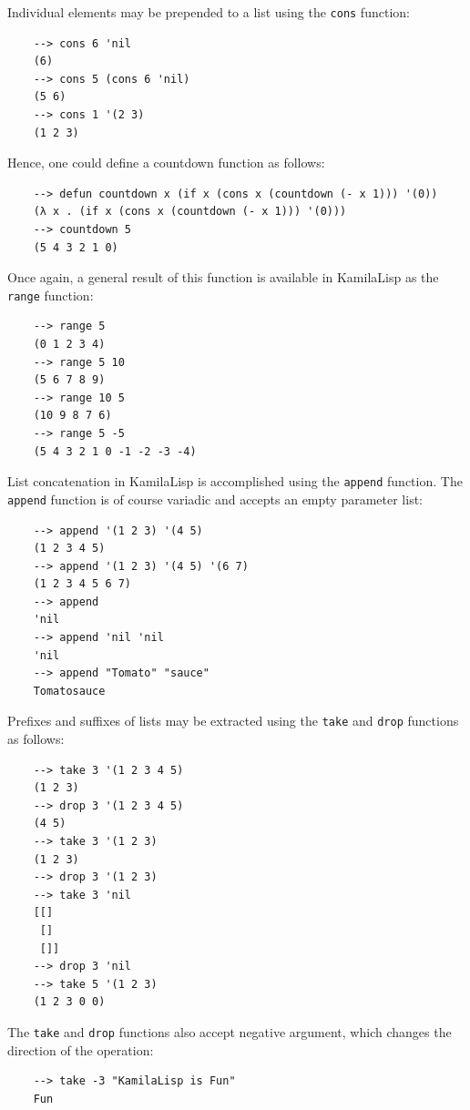 Individual elements may be prepended to a list using the \verb|cons| function:

\begin{Verbatim}
    --> cons 6 'nil
    (6)
    --> cons 5 (cons 6 'nil)
    (5 6)
    --> cons 1 '(2 3)
    (1 2 3)
\end{Verbatim}

Hence, one could define a countdown function as follows:

\begin{Verbatim}
    --> defun countdown x (if x (cons x (countdown (- x 1))) '(0))
    (λ x . (if x (cons x (countdown (- x 1))) '(0)))
    --> countdown 5
    (5 4 3 2 1 0)
\end{Verbatim}

Once again, a general result of this function is available in KamilaLisp as the \verb|range| function:

\begin{Verbatim}
    --> range 5
    (0 1 2 3 4)
    --> range 5 10
    (5 6 7 8 9)
    --> range 10 5
    (10 9 8 7 6)
    --> range 5 -5
    (5 4 3 2 1 0 -1 -2 -3 -4)
\end{Verbatim}

List concatenation in KamilaLisp is accomplished using the \verb|append| function. The \verb|append| function is of course variadic and accepts an empty parameter list:

\begin{Verbatim}
    --> append '(1 2 3) '(4 5)
    (1 2 3 4 5)
    --> append '(1 2 3) '(4 5) '(6 7)
    (1 2 3 4 5 6 7)
    --> append
    'nil
    --> append 'nil 'nil
    'nil
    --> append "Tomato" "sauce"
    Tomatosauce
\end{Verbatim}

Prefixes and suffixes of lists may be extracted using the \verb|take| and \verb|drop| functions as follows:

\begin{Verbatim}
    --> take 3 '(1 2 3 4 5)
    (1 2 3)
    --> drop 3 '(1 2 3 4 5)
    (4 5)
    --> take 3 '(1 2 3)
    (1 2 3)
    --> drop 3 '(1 2 3)
    --> take 3 'nil
    [[]
     []
     []]
    --> drop 3 'nil
    --> take 5 '(1 2 3)
    (1 2 3 0 0)
\end{Verbatim}

The \verb|take| and \verb|drop| functions also accept negative argument, which changes the direction of the operation:

\begin{Verbatim}
    --> take -3 "KamilaLisp is Fun"
    Fun
\end{Verbatim}

